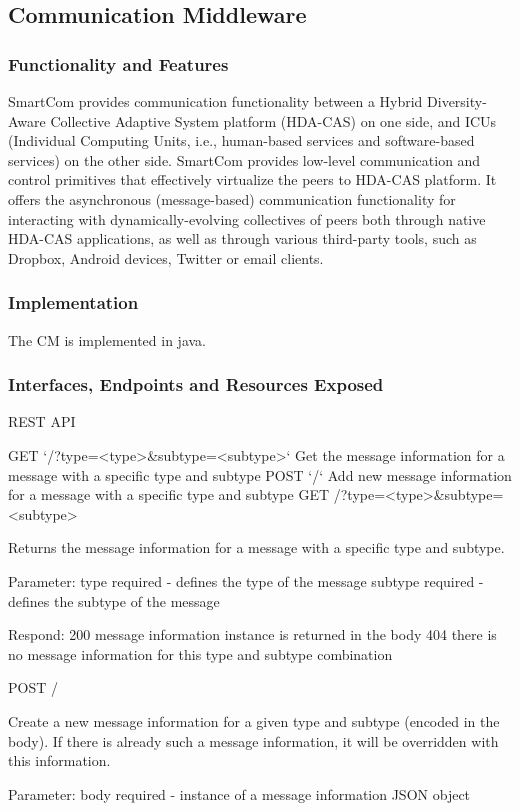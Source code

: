 \subsection{Communication Middleware}
\subsubsection{Functionality and Features}
SmartCom provides communication functionality between a Hybrid Diversity-Aware Collective Adaptive System platform (HDA-CAS) on one side, and ICUs (Individual Computing Units, i.e., human-based services and software-based services) on the other side. SmartCom provides low-level communication and control primitives that effectively virtualize the peers to HDA-CAS platform. It offers the asynchronous (message-based) communication functionality for interacting with dynamically-evolving collectives of peers both through native HDA-CAS applications, as well as through various third-party tools, such as Dropbox, Android devices, Twitter or email clients.
\subsubsection{Implementation}
The CM is implemented in java.
\subsubsection{Interfaces, Endpoints and Resources Exposed}
REST API

GET	`/?type=<type>&subtype=<subtype>`	Get the message information for a message with a specific type and subtype
POST	`/`	Add new message information for a message with a specific type and subtype
GET /?type=<type>&subtype=<subtype>

Returns the message information for a message with a specific type and subtype.

Parameter:
type required - defines the type of the message subtype required - defines the subtype of the message

Respond:
200 message information instance is returned in the body
404 there is no message information for this type and subtype combination

POST /

Create a new message information for a given type and subtype (encoded in the body). If there is already such a message information, it will be overridden with this information.

Parameter:
body required - instance of a message information JSON object

